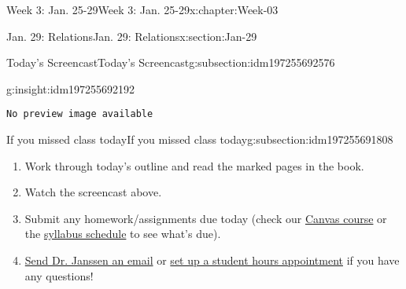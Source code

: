 \documentclass[oneside,10pt,]{book}
\newcommand{\mono}[1]{\texttt{#1}}
\numberwithin{equation}{section}
\newlength{\qrsize}
\newlength{\previewwidth}
\begin{document}
\begin{chapterptx}{Week 3: Jan. 25-29}{}{Week 3: Jan. 25-29}{}{}{x:chapter:Week-03}
\begin{sectionptx}{Jan. 29: Relations}{}{Jan. 29: Relations}{}{}{x:section:Jan-29}
\begin{subsectionptx}{Today's Screencast}{}{Today's Screencast}{}{}{g:subsection:idm197255692576}
\begin{insight}{}{g:insight:idm197255692192}
\setlength{\previewwidth}{\linewidth}
\addtolength{\previewwidth}{-\qrsize}
\begin{tcbraster}[raster columns=2, raster column skip=1pt, raster halign=center, raster force size=false, raster left skip=0pt, raster right skip=0pt]%
\begin{tcolorbox}[previewstyle, width=\previewwidth]%
\mono{No preview image available}%
\end{tcolorbox}%
\begin{tcolorbox}[qrstyle]%
[QR LINK]\end{tcolorbox}%
\end{tcbraster}%
\end{insight}
\end{subsectionptx}
%
%
\typeout{************************************************}
\typeout{************************************************}
%
\begin{subsectionptx}{If you missed class today}{}{If you missed class today}{}{}{g:subsection:idm197255691808}
%
\begin{enumerate}
\item{}Work through today's outline and read the marked pages in the book.%
\item{}Watch the screencast above.%
\item{}Submit any homework\slash{}assignments due today (check our \href{https://dordt.instructure.com/courses/3110050}{Canvas course} or the \href{https://prof.mkjanssen.org/ds/index.html\#schedule}{syllabus schedule} to see what's due).%
\item{}\href{mailto:mike.janssen@dordt.edu}{Send Dr. Janssen an email} or \href{https://calendly.com/mkjanssen/student-hours}{set up a student hours appointment} if you have any questions!%
\end{enumerate}
\end{subsectionptx}
\end{sectionptx}
\end{chapterptx}
%
%
\typeout{************************************************}
\typeout{************************************************}
%
\end{document}
